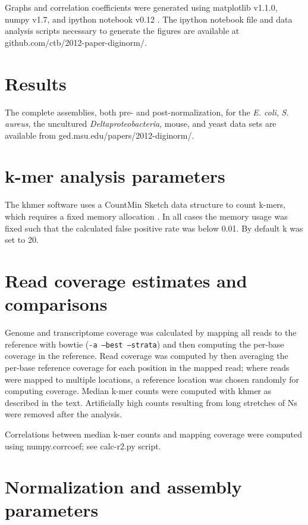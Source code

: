 \documentclass{pnastwo}
\begin{document}
\begin{article}
\begin{materials}
Graphs and correlation coefficients were generated using matplotlib
v1.1.0, numpy v1.7, and ipython notebook v0.12 \cite{ipython}.  The
ipython notebook file and data analysis scripts necessary to generate
the figures are available at 
  github.com/ctb/2012-paper-diginorm/.

\section{Results}

The complete assemblies, both pre- and post-normalization, for the
{\em E. coli}, {\em S. aureus}, the uncultured {\em
  Deltaproteobacteria}, mouse, and yeast data sets are available from
ged.msu.edu/papers/2012-diginorm/.


\section{k-mer analysis parameters}

The khmer software uses a CountMin Sketch data structure to count
k-mers, which requires a fixed memory allocation
\cite{countminsketch}.  In all cases the memory usage was fixed such
that the calculated false positive rate was below 0.01.  By default k
was set to 20.

\section{Read coverage estimates and comparisons}

Genome and transcriptome coverage was calculated by mapping all reads
to the reference with bowtie ({\tt -a --best --strata}) and then
computing the per-base coverage in the reference.  Read coverage was
computed by then averaging the per-base reference coverage for each
position in the mapped read; where reads were mapped to multiple
locations, a reference location was chosen randomly for computing
coverage.  Median k-mer counts were computed with khmer as described
in the text.  Artificially high counts resulting from long stretches
of Ns were removed after the analysis.

Correlations between median k-mer counts and mapping coverage were
computed using numpy.corrcoef; see calc-r2.py script.

\section{Normalization and assembly parameters}


\end{materials}
\end{article}
\end{document}

